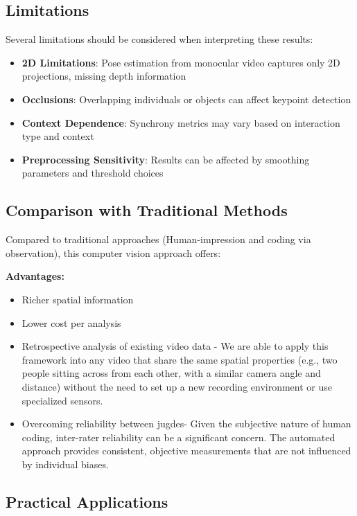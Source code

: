 \documentclass[11pt]{article}
\begin{document}
\subsection{Limitations}

Several limitations should be considered when interpreting these results:

\begin{itemize}
    \item \textbf{2D Limitations}: Pose estimation from monocular video captures only 2D projections, missing depth information
    \item \textbf{Occlusions}: Overlapping individuals or objects can affect keypoint detection
    \item \textbf{Context Dependence}: Synchrony metrics may vary based on interaction type and context
    \item \textbf{Preprocessing Sensitivity}: Results can be affected by smoothing parameters and threshold choices
\end{itemize}

\subsection{Comparison with Traditional Methods}

Compared to traditional approaches (Human-impression and coding via observation), this computer vision approach offers:

\textbf{Advantages:}
\begin{itemize}

    \item Richer spatial information
    \item Lower cost per analysis
    \item Retrospective analysis of existing video data - We are able to apply this framework into any video that share the same spatial properties (e.g., two people sitting across from each other, with a similar camera angle and distance) without the need to set up a new recording environment or use specialized sensors.
    \item Overcoming reliability between jugdes- Given the subjective nature of human coding, inter-rater reliability can be a significant concern. The automated approach provides consistent, objective measurements that are not influenced by individual biases.

\end{itemize}


\subsection{Practical Applications}
\end{document}
